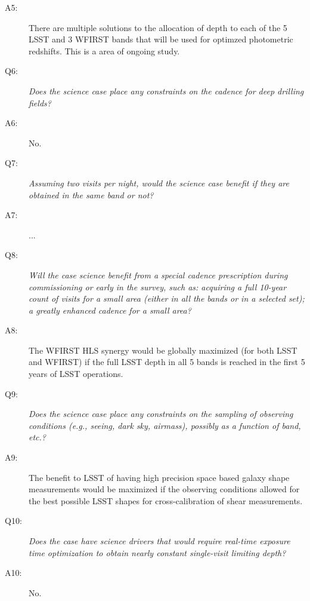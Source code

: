 \begin{description}
\item[A5:] There are multiple solutions to the allocation of depth to each of the 5 LSST and 3 WFIRST bands that will be used for optimzed photometric redshifts. This is a area of ongoing study.

\item[Q6:] {\it Does the science case place any constraints on the
cadence for deep drilling fields?}

\item[A6:] No.

\item[Q7:] {\it Assuming two visits per night, would the science case
benefit if they are obtained in the same band or not?}

\item[A7:] ...

\item[Q8:] {\it Will the case science benefit from a special cadence
prescription during commissioning or early in the survey, such as:
acquiring a full 10-year count of visits for a small area (either in all
the bands or in a  selected set); a greatly enhanced cadence for a small
area?}

\item[A8:] The WFIRST HLS synergy would be globally maximized (for both
LSST and WFIRST) if the full LSST depth in all 5 bands is reached in the
first 5 years of LSST operations.

\item[Q9:] {\it Does the science case place any constraints on the
sampling of observing conditions (e.g., seeing, dark sky, airmass),
possibly as a function of band, etc.?}

\item[A9:] The benefit to LSST of having high precision space based
galaxy shape measurements would be maximized if the observing conditions
allowed for the best possible LSST shapes for cross-calibration of shear
measurements.

\item[Q10:] {\it Does the case have science drivers that would require
real-time exposure time optimization to obtain nearly constant
single-visit limiting depth?}

\item[A10:] No.

\end{description}


\navigationbar
